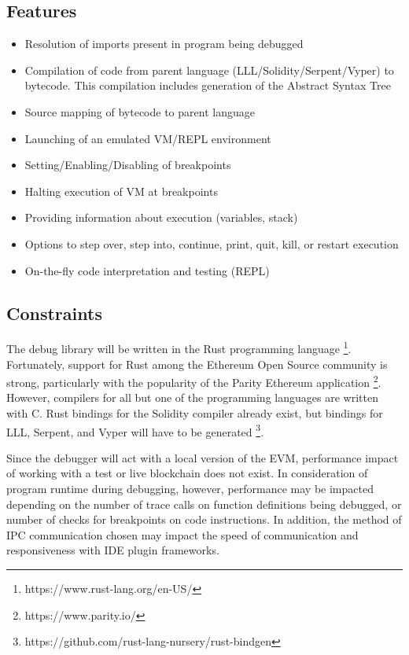 \documentclass[]{article}
\begin{document}
\subsection{Features}
\begin{itemize}
\item Resolution of imports present in program being debugged
\item Compilation of code from parent language (LLL/Solidity/Serpent/Vyper) to bytecode. This compilation includes generation of the Abstract Syntax Tree
\item Source mapping of bytecode to parent language
\item Launching of an emulated VM/REPL environment
\item Setting/Enabling/Disabling of breakpoints
\item Halting execution of VM at breakpoints
\item Providing information about execution (variables, stack)
\item Options to step over, step into, continue, print, quit, kill, or restart execution
\item On-the-fly code interpretation and testing (REPL)
\end{itemize}

\subsection{Constraints}
The debug library will be written in the Rust programming language \footnote{https://www.rust-lang.org/en-US/}. Fortunately, support for Rust among the Ethereum Open Source community is strong, particularly with the popularity of the Parity Ethereum application \footnote{https://www.parity.io/}. However, compilers for all but one of the programming languages are written with C. Rust bindings for the Solidity compiler already exist, but bindings for LLL, Serpent, and Vyper will have to be generated \footnote{https://github.com/rust-lang-nursery/rust-bindgen}. 

Since the debugger will act with a local version of the EVM, performance impact of working with a test or live blockchain does not exist. In consideration of program runtime during debugging, however, performance may be impacted depending on the number of trace calls on function definitions being debugged, or number of checks for breakpoints on code instructions. In addition, the method of IPC communication chosen may impact the speed of communication and responsiveness with IDE plugin frameworks.
\end{document}
